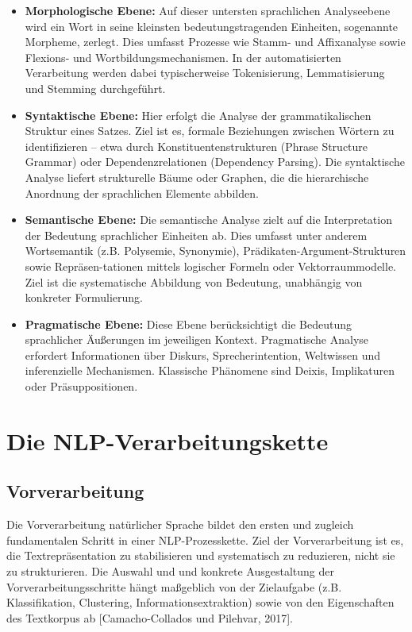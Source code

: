 \begin{itemize}
    \item \textbf{Morphologische Ebene:}
     Auf dieser untersten sprachlichen Analyseebene wird ein Wort in seine kleinsten bedeutungstragenden Einheiten, sogenannte Morpheme, zerlegt. Dies umfasst Prozesse wie Stamm- und Affixanalyse sowie Flexions- und Wortbildungsmechanismen. In der automatisierten Verarbeitung werden dabei typischerweise Tokenisierung, Lemmatisierung und Stemming durchgeführt.
    \item \textbf{Syntaktische Ebene:}
     Hier erfolgt die Analyse der grammatikalischen Struktur eines Satzes. Ziel ist es, formale Beziehungen zwischen Wörtern zu identifizieren – etwa durch Konstituentenstrukturen (Phrase Structure Grammar) oder Dependenzrelationen (Dependency Parsing). Die syntaktische Analyse liefert strukturelle Bäume oder Graphen, die die hierarchische Anordnung der sprachlichen Elemente abbilden.
    \item \textbf{Semantische Ebene:}
     Die semantische Analyse zielt auf die Interpretation der Bedeutung sprachlicher Einheiten ab. Dies umfasst unter anderem Wortsemantik (z.B. Polysemie, Synonymie), Prädikaten-Argument-Strukturen sowie Repräsen-tationen mittels logischer Formeln oder Vektorraummodelle. Ziel ist die systematische Abbildung von Bedeutung, unabhängig von konkreter Formulierung.
    \item \textbf{Pragmatische Ebene:}
     Diese Ebene berücksichtigt die Bedeutung sprachlicher Äußerungen im jeweiligen Kontext. Pragmatische Analyse erfordert Informationen über Diskurs, Sprecherintention, Weltwissen und inferenzielle Mechanismen. Klassische Phänomene sind Deixis, Implikaturen oder Präsuppositionen.
\end{itemize}

\section{Die NLP-Verarbeitungskette}


\subsection{Vorverarbeitung}

Die Vorverarbeitung natürlicher Sprache bildet den ersten und zugleich fundamentalen Schritt in einer NLP-Prozesskette. Ziel der Vorverarbeitung ist es, die Textrepräsentation zu stabilisieren und systematisch zu reduzieren, nicht sie zu strukturieren. Die Auswahl und und konkrete Ausgestaltung der Vorverarbeitungsschritte hängt maßgeblich von der Zielaufgabe (z.B. Klassifikation, Clustering, Informationsextraktion) sowie von den Eigenschaften des Textkorpus ab [Camacho-Collados und Pilehvar, 2017].

